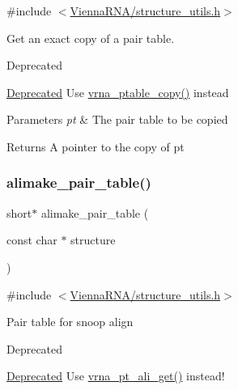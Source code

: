 {\ttfamily \#include $<$\hyperlink{structure__utils_8h}{Vienna\+R\+N\+A/structure\+\_\+utils.\+h}$>$}



Get an exact copy of a pair table. 

\begin{DoxyRefDesc}{Deprecated}
\item[\hyperlink{deprecated__deprecated000141}{Deprecated}]Use \hyperlink{group__struct__utils_ga2daefbbd6d9f8803731651882f54332d}{vrna\+\_\+ptable\+\_\+copy()} instead\end{DoxyRefDesc}



\begin{DoxyParams}{Parameters}
{\em pt} & The pair table to be copied \\
\hline
\end{DoxyParams}
\begin{DoxyReturn}{Returns}
A pointer to the copy of \textquotesingle{}pt\textquotesingle{} 
\end{DoxyReturn}
\mbox{\label{group__struct__utils_ga3c81b3967056c3888b8472b65fbb16f5}} 
\subsubsection{\texorpdfstring{alimake\+\_\+pair\+\_\+table()}{alimake\_pair\_table()}}
{\footnotesize\ttfamily short$\ast$ alimake\+\_\+pair\+\_\+table (\begin{DoxyParamCaption}\item[{const char $\ast$}]{structure }\end{DoxyParamCaption})}



{\ttfamily \#include $<$\hyperlink{structure__utils_8h}{Vienna\+R\+N\+A/structure\+\_\+utils.\+h}$>$}

Pair table for snoop align

\begin{DoxyRefDesc}{Deprecated}
\item[\hyperlink{deprecated__deprecated000142}{Deprecated}]Use \hyperlink{group__struct__utils_ga1ee4cdcda1f57d32dcb38032116d335d}{vrna\+\_\+pt\+\_\+ali\+\_\+get()} instead! \end{DoxyRefDesc}
\mbox{\label{group__struct__utils_ga9aa3bf3b4346bb7fb88efc154dd07a79}} 
